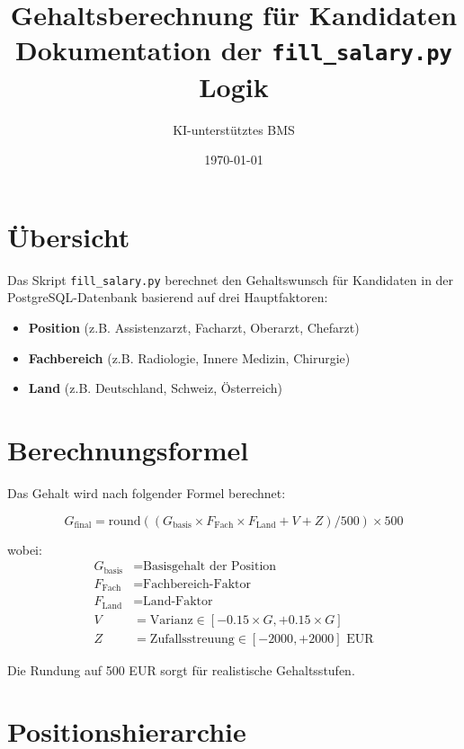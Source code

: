 \documentclass[12pt,a4paper]{article}
\title{Gehaltsberechnung für Kandidaten\\
\large Dokumentation der \texttt{fill\_salary.py} Logik}
\author{KI-unterstütztes BMS}
\date{\today}
\begin{document}
\maketitle
\tableofcontents
\newpage

\section{Übersicht}

Das Skript \texttt{fill\_salary.py} berechnet den Gehaltswunsch für Kandidaten in der PostgreSQL-Datenbank basierend auf drei Hauptfaktoren:

\begin{itemize}
    \item \textbf{Position} (z.B. Assistenzarzt, Facharzt, Oberarzt, Chefarzt)
    \item \textbf{Fachbereich} (z.B. Radiologie, Innere Medizin, Chirurgie)
    \item \textbf{Land} (z.B. Deutschland, Schweiz, Österreich)
\end{itemize}

\section{Berechnungsformel}

Das Gehalt wird nach folgender Formel berechnet:

\begin{equation}
    G_{\text{final}} = \text{round}\left(\left(G_{\text{basis}} \times F_{\text{Fach}} \times F_{\text{Land}} + V + Z\right) / 500\right) \times 500
\end{equation}

wobei:
\begin{align*}
    G_{\text{basis}} &= \text{Basisgehalt der Position} \\
    F_{\text{Fach}} &= \text{Fachbereich-Faktor} \\
    F_{\text{Land}} &= \text{Land-Faktor} \\
    V &= \text{Varianz} \in [-0.15 \times G, +0.15 \times G] \\
    Z &= \text{Zufallsstreuung} \in [-2000, +2000] \text{ EUR}
\end{align*}

Die Rundung auf 500 EUR sorgt für realistische Gehaltsstufen.

\section{Positionshierarchie}
\end{document}
